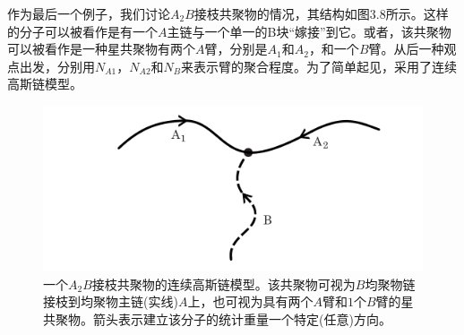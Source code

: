 作为最后一个例子，我们讨论$A_2B$接枝共聚物的情况，其结构如图$3.8$所示。这样的分子可以被看作是有一个$A$主链与一个单一的B块“嫁接”到它。或者，该共聚物可以被看作是一种星共聚物有两个$A$臂，分别是$A_1$和$A_2$，和一个$B$臂。从后一种观点出发，分别用$N_{A1}$，$N_{A2}$和$N_B$来表示臂的聚合程度。为了简单起见，采用了连续高斯链模型。

\begin{figure}[H]
\centering
\includegraphics[scale=0.7]{./figures/38.png}
\caption{一个$A_2B$接枝共聚物的连续高斯链模型。该共聚物可视为$B$均聚物链接枝到均聚物主链(实线)$A$上，也可视为具有两个$A$臂和$1$个$B$臂的星共聚物。箭头表示建立该分子的统计重量一个特定(任意)方向。}
\end{figure}		

